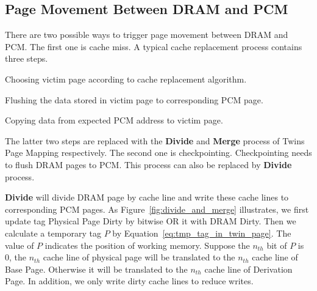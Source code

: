 \documentclass[conference]{IEEEtran}
\begin{document}
\subsection{Page Movement Between DRAM and PCM}\label{sec:implementation_hybrid_memory_system}



There are two possible ways to trigger page movement between DRAM and PCM\@.
The first one is cache miss.
A typical cache replacement process contains three steps.
\begin{enumerate*}
    \item Choosing victim page according to cache replacement algorithm.
    \item Flushing the data stored in victim page to corresponding PCM page.
    \item Copying data from expected PCM address to victim page.
\end{enumerate*}
The latter two steps are replaced with the \textbf{Divide} and \textbf{Merge} process of Twins Page Mapping respectively.
The second one is checkpointing.
Checkpointing needs to flush DRAM pages to PCM\@.
This process can also be replaced by \textbf{Divide} process.

\textbf{Divide} will divide DRAM page by cache line and write these cache lines to corresponding PCM pages.
As Figure~\ref{fig:divide_and_merge} illustrates, we first update tag Physical Page Dirty by bitwise OR it with DRAM Dirty.
Then we calculate a temporary tag $P$ by Equation~\ref{eq:tmp_tag_in_twin_page}.
The value of $P$ indicates the position of working memory.
Suppose the $n_{th}$ bit of $P$ is 0, the $n_{th}$ cache line of physical page will be translated to the $n_{th}$ cache line of Base Page.
Otherwise it will be translated to the $n_{th}$ cache line of Derivation Page.
In addition, we only write dirty cache lines to reduce writes.
\end{document}
